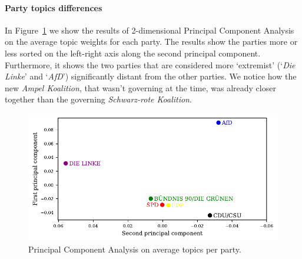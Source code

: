 \documentclass{article}
\begin{document}
\paragraph{Party topics differences}
In Figure~\ref{pca_plot} we show the results of 2-dimensional Principal Component Analysis on the average topic weights for each party.
The results show the parties more or less sorted on the left-right axis along the second principal component.
Furthermore, it shows the two parties that are considered more `extremist' (`\textit{Die Linke}' and `\textit{AfD}') significantly distant from the other parties.
We notice how the new \textit{Ampel Koalition}, that wasn't governing at the time, was already closer together than the governing \textit{Schwarz-rote Koalition}.

\begin{figure}
  \centering
  \includegraphics[width=0.9\linewidth]{images/pca.pdf}
  \captionsetup{width=0.9\linewidth}
  \caption{
    Principal Component Analysis on average topics per party.
  }
  \label{pca_plot}
\end{figure}
\end{document}
